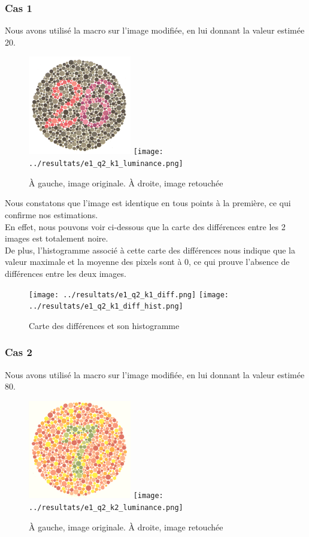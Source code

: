 \documentclass[a4paper]{article}
\begin{document}
\subsubsection{Cas 1}
Nous avons utilisé la macro sur l'image modifiée, en lui donnant la valeur estimée 20.

\begin{figure}[H]
\begin{center}
\includegraphics[width=170px]{../base/cas_1_dalton26.png}
\texttt{[image: ../resultats/e1\_q2\_k1\_luminance.png]}
\end{center}
\caption{À gauche, image originale. À droite, image retouchée}
\end{figure}

Nous constatons que l'image est identique en tous points à la première, ce qui confirme nos estimations.\\
En effet, nous pouvons voir ci-dessous que la carte des différences entre les 2 images est totalement noire.\\
De plus, l'histogramme associé à cette carte des différences nous indique que la valeur maximale et la moyenne des pixels sont à 0, ce qui prouve l'absence de différences entre les deux images.

\begin{figure}[H]
\begin{center}
\texttt{[image: ../resultats/e1\_q2\_k1\_diff.png]}
\texttt{[image: ../resultats/e1\_q2\_k1\_diff\_hist.png]}
\end{center}
\caption{Carte des différences et son histogramme}
\end{figure}

\clearpage
\subsubsection{Cas 2}
Nous avons utilisé la macro sur l'image modifiée, en lui donnant la valeur estimée 80.

\begin{figure}[H]
\begin{center}
\includegraphics[width=170px]{../base/cas_2_dalton7.png}
\texttt{[image: ../resultats/e1\_q2\_k2\_luminance.png]}
\end{center}
\caption{À gauche, image originale. À droite, image retouchée}
\end{figure}
\end{document}
